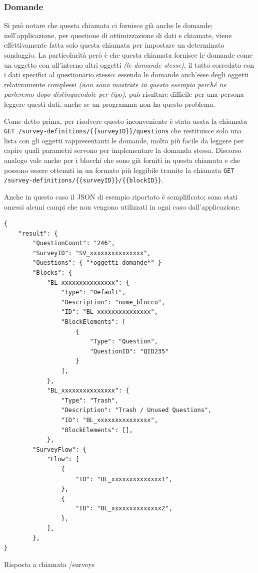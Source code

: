 \subsubsection{Domande}
Si può notare che questa chiamata ci fornisce già anche le domande; nell'applicazione, per questione di ottimizzazione di dati e chiamate, viene effettivamente fatta solo questa chiamata per impostare un determinato sondaggio. La particolarità però è che questa chiamata fornisce le domande come un oggetto con all'interno altri oggetti \textit{(le domande stesse)}, il tutto corredato con i dati specifici al questionario stesso: essendo le domande anch'esse degli oggetti relativamente complessi \textit{(non sono mostrate in questo esempio perché ne parleremo dopo distinguendole per tipo)}, può risultare difficile per una persona leggere questi dati, anche se un programma non ha questo problema.

Come detto prima, per risolvere questo inconveniente è stata usata la chiamata \texttt{GET /survey-definitions/\{\{surveyID\}\}/questions} che restituisce solo una lista con gli oggetti rappresentanti le domande, molto più facile da leggere per capire quali parametri servono per implementare la domanda stessa.
Discorso analogo vale anche per i blocchi che sono già forniti in questa chiamata e che possono essere ottenuti in un formato più leggibile tramite la chiamata \texttt{GET /survey-definitions/\{\{surveyID\}\}/\{\{blockID\}\}}.

Anche in questo caso il JSON di esempio riportato è semplificato; sono stati omessi alcuni campi che non vengono utilizzati in ogni caso dall'applicazione.

\newpage
\begin{json}
\begin{verbatim}
{
    "result": {
        "QuestionCount": "246",
        "SurveyID": "SV_xxxxxxxxxxxxxxx",
        "Questions": { "*oggetti domande*" }
        "Blocks": {
            "BL_xxxxxxxxxxxxxxx": {
                "Type": "Default",
                "Description": "nome_blocco",
                "ID": "BL_xxxxxxxxxxxxxxx",
                "BlockElements": [
                    {
                        "Type": "Question",
                        "QuestionID": "QID235"
                    }
                ],
            },
            "BL_xxxxxxxxxxxxxxx": {
                "Type": "Trash",
                "Description": "Trash / Unused Questions",
                "ID": "BL_xxxxxxxxxxxxxxx",
                "BlockElements": [],
            },
        "SurveyFlow": {
            "Flow": [
                {
                    "ID": "BL_xxxxxxxxxxxxxx1",
                },
                {
                    "ID": "BL_xxxxxxxxxxxxxx2",
                },
            ],
        },
}
\end{verbatim}
\caption{Risposta a chiamata /surveys}
\label{json:surveyID}
\end{json}

